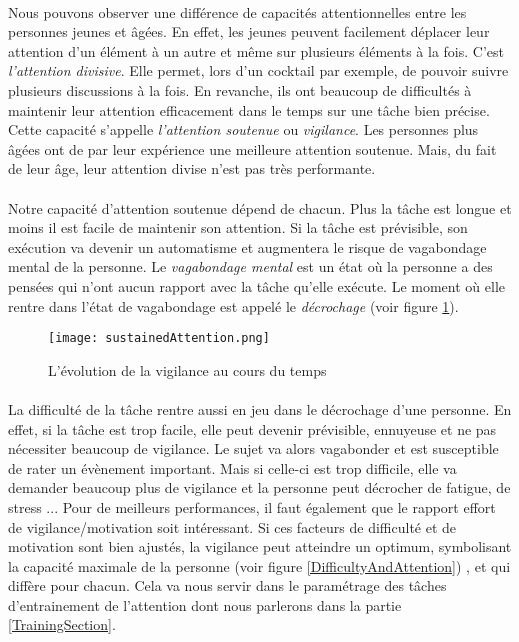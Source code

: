 \paragraph{}Nous pouvons observer une différence de capacités attentionnelles entre les personnes jeunes et âgées. En effet, les jeunes peuvent facilement déplacer leur attention
d'un élément à un autre et même sur plusieurs éléments à la fois. C'est \emph{l'attention divisive}. Elle permet, lors d'un cocktail par exemple, de pouvoir suivre plusieurs discussions
à la fois. En revanche, ils ont beaucoup de difficultés à maintenir leur attention efficacement dans le temps sur une tâche bien précise. Cette capacité s'appelle
\emph{l'attention soutenue} ou \emph{vigilance}. Les personnes plus âgées ont de par leur expérience une meilleure attention soutenue. Mais, du fait de leur âge, leur attention divise
n'est pas très performante.

\paragraph{}Notre capacité d'attention soutenue dépend de chacun. Plus la tâche est longue et moins il est facile de maintenir son attention. Si la tâche est prévisible, son exécution
va devenir un automatisme et augmentera le risque de vagabondage mental de la personne. Le \emph{vagabondage mental} est un état où la personne a des pensées qui n'ont aucun rapport
avec la tâche qu'elle exécute. Le moment où elle rentre dans l'état de vagabondage est appelé le \emph{décrochage} (voir figure \ref{SustainedAttention}).

\begin{figure}[h]
    \begin{center}
    \texttt{[image: sustainedAttention.png]}
    \end{center}
    \caption{L'évolution de la vigilance au cours du temps}
\label{SustainedAttention}
\end{figure}

\paragraph{}La difficulté de la tâche rentre aussi en jeu dans le décrochage d'une personne. En effet, si la tâche est trop facile, elle peut devenir prévisible, ennuyeuse et ne
pas nécessiter beaucoup de vigilance. Le sujet va alors vagabonder et est susceptible de rater un évènement important. Mais si celle-ci est trop difficile, elle va demander beaucoup
plus de vigilance et la personne peut décrocher de fatigue, de stress ... Pour de meilleurs performances, il faut également que le rapport effort de vigilance/motivation soit
intéressant. Si ces facteurs de difficulté et de motivation sont bien ajustés, la vigilance peut atteindre un optimum, symbolisant la capacité maximale de la personne (voir figure
\ref{DifficultyAndAttention}) , et qui diffère pour chacun. Cela va nous servir dans le paramétrage des tâches d'entrainement de l'attention dont nous parlerons dans la partie
\ref{TrainingSection}.

